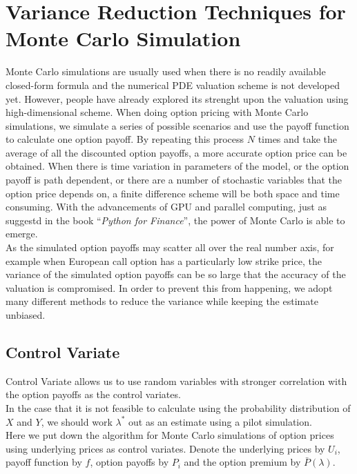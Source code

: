 \section*{Variance Reduction Techniques for Monte Carlo Simulation}
Monte Carlo simulations are usually used when there is no readily available closed-form formula and the numerical PDE valuation scheme is not developed yet. However, people have already explored its strenght upon the valuation using high-dimensional scheme. When doing option pricing with Monte Carlo simulations, we simulate a series of possible scenarios and use the payoff function to calculate one option payoff. By repeating this process $N$ times and take the average of all the discounted option payoffs, a more accurate option price can be obtained. When there is time variation in parameters of the model, or the option payoff is path dependent, or there are a number of stochastic variables that the option price depends on, a finite difference scheme will be both space and time consuming. With the advancements of GPU and parallel computing, just as suggestd in the book ``\emph{Python for Finance}''\cite{PythonForFinance}, the power of Monte Carlo is able to emerge.\\[3mm]
As the simulated option payoffs may scatter all over the real number axis, for example when European call option has a particularly low strike price, the variance of the simulated option payoffs can be so large that the accuracy of the valuation is compromised. In order to prevent this from happening, we adopt many different methods to reduce the variance while keeping the estimate unbiased. \cite{VarianceReduction}

\subsection*{Control Variate}
Control Variate allows us to use random variables with stronger correlation with the option payoffs as the control variates.\\
In the case that it is not feasible to calculate using the probability distribution of $X$ and $Y$, we should work $\lambda^{*}$ out as an estimate using a pilot simulation.\\[5mm]
Here we put down the algorithm for Monte Carlo simulations of option prices using underlying prices as control variates. Denote the underlying prices by $U_{i}$, payoff function by $f$, option payoffs by $P_{i}$ and the option premium by $\bar{P}(\lambda)$.\\[5mm]

